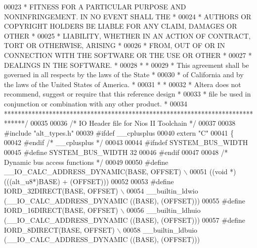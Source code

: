 \begin{DoxyCode}
00023 \textcolor{comment}{* FITNESS FOR A PARTICULAR PURPOSE AND NONINFRINGEMENT. IN NO EVENT SHALL THE *}
00024 \textcolor{comment}{* AUTHORS OR COPYRIGHT HOLDERS BE LIABLE FOR ANY CLAIM, DAMAGES OR OTHER      *}
00025 \textcolor{comment}{* LIABILITY, WHETHER IN AN ACTION OF CONTRACT, TORT OR OTHERWISE, ARISING     *}
00026 \textcolor{comment}{* FROM, OUT OF OR IN CONNECTION WITH THE SOFTWARE OR THE USE OR OTHER         *}
00027 \textcolor{comment}{* DEALINGS IN THE SOFTWARE.                                                   *}
00028 \textcolor{comment}{*                                                                             *}
00029 \textcolor{comment}{* This agreement shall be governed in all respects by the laws of the State   *}
00030 \textcolor{comment}{* of California and by the laws of the United States of America.              *}
00031 \textcolor{comment}{*                                                                             *}
00032 \textcolor{comment}{* Altera does not recommend, suggest or require that this reference design    *}
00033 \textcolor{comment}{* file be used in conjunction or combination with any other product.          *}
00034 \textcolor{comment}{******************************************************************************/}
00035 
00036 \textcolor{comment}{/* IO Header file for Nios II Toolchain */}
00037 
00038 \textcolor{preprocessor}{#include "alt_types.h"}
00039 \textcolor{preprocessor}{#ifdef \_\_cplusplus}
00040 \textcolor{keyword}{extern} \textcolor{stringliteral}{"C"}
00041 \{
00042 \textcolor{preprocessor}{#endif }\textcolor{comment}{/* \_\_cplusplus */}\textcolor{preprocessor}{}
00043 
00044 \textcolor{preprocessor}{#ifndef SYSTEM\_BUS\_WIDTH}
00045 \textcolor{preprocessor}{#define SYSTEM\_BUS\_WIDTH 32}
00046 \textcolor{preprocessor}{#endif}
00047 
00048 \textcolor{comment}{/* Dynamic bus access functions */}
00049 
00050 \textcolor{preprocessor}{#define \_\_IO\_CALC\_ADDRESS\_DYNAMIC(BASE, OFFSET) \(\backslash\)}
00051 \textcolor{preprocessor}{  ((void *)(((alt\_u8*)BASE) + (OFFSET)))}
00052 
00053 \textcolor{preprocessor}{#define IORD\_32DIRECT(BASE, OFFSET) \(\backslash\)}
00054 \textcolor{preprocessor}{  \_\_builtin\_ldwio (\_\_IO\_CALC\_ADDRESS\_DYNAMIC ((BASE), (OFFSET)))}
00055 \textcolor{preprocessor}{#define IORD\_16DIRECT(BASE, OFFSET) \(\backslash\)}
00056 \textcolor{preprocessor}{  \_\_builtin\_ldhuio (\_\_IO\_CALC\_ADDRESS\_DYNAMIC ((BASE), (OFFSET)))}
00057 \textcolor{preprocessor}{#define IORD\_8DIRECT(BASE, OFFSET) \(\backslash\)}
00058 \textcolor{preprocessor}{  \_\_builtin\_ldbuio (\_\_IO\_CALC\_ADDRESS\_DYNAMIC ((BASE), (OFFSET)))}

\end{DoxyCode}
